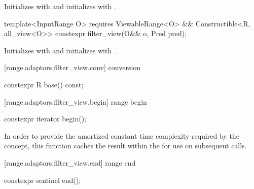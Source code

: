 \begin{itemdescr}
\pnum
\effects Initializes  with  and initializes
 with .
\end{itemdescr}

%
\begin{itemdecl}
template<InputRange O>
  requires ViewableRange<O> && Constructible<R, all_view<O>>
constexpr filter_view(O&& o, Pred pred);
\end{itemdecl}

\begin{itemdescr}
\pnum
\effects Initializes  with 
and initializes  with .
\end{itemdescr}

[range.adaptors.filter_view.conv]{ conversion}

%
\begin{itemdecl}
constexpr R base() const;
\end{itemdecl}

\begin{itemdescr}
\pnum
\oldtxt{\returns}  
\end{itemdescr}

[range.adaptors.filter_view.begin]{ range begin}

%
\begin{itemdecl}
constexpr iterator begin();
\end{itemdecl}

\begin{itemdescr}
\pnum
{} \newtxt{\returns}

\pnum
\remarks In order to provide the amortized constant time complexity required by
the  concept, this function caches the result within the
 for use on subsequent calls.
\end{itemdescr}

[range.adaptors.filter_view.end]{ range end}

%
\begin{itemdecl}
constexpr sentinel end();
\end{itemdecl}

